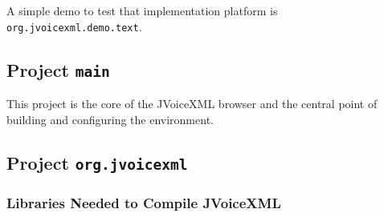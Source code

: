 \documentclass[11pt,a4paper]{article}
\begin{document}
A simple demo to test that implementation platform is
\lstinline{org.jvoicexml.demo.text}.

\subsection{Project \texttt{main}}

This project is the core of the JVoiceXML browser and the central point of
building and configuring the environment.

\subsection{Project \texttt{org.jvoicexml}}


\subsubsection{Libraries Needed to Compile JVoiceXML}
\label{sec:libr-need-comp}
\end{document}
